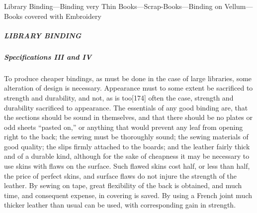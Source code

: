 \documentclass[
]{article}
\begin{document}
Library Binding---Binding very Thin Books---Scrap-Books---Binding on
Vellum---Books covered with Embroidery

\hypertarget{library-binding}{%
\subparagraph{LIBRARY BINDING}\label{library-binding}}

\hypertarget{specifications-iii-and-iv}{%
\subparagraph{\texorpdfstring{\emph{Specifications III and
IV}}{Specifications III and IV}}\label{specifications-iii-and-iv}}

{To} produce cheaper bindings, as must be done in the case of large
libraries, some alteration of design is necessary. Appearance must to
some extent be sacrificed to strength and durability, and not, as is
too{\protect\hypertarget{Page_174}{}{{[}174{]}}} often the case,
strength and durability sacrificed to appearance. The essentials of any
good binding are, that the sections should be sound in themselves, and
that there should be no plates or odd sheets ``pasted on,'' or anything
that would prevent any leaf from opening right to the back; the sewing
must be thoroughly sound; the sewing materials of good quality; the
slips firmly attached to the boards; and the leather fairly thick and of
a durable kind, although for the sake of cheapness it may be necessary
to use skins with flaws on the surface. Such flawed skins cost half, or
less than half, the price of perfect skins, and surface flaws do not
injure the strength of the leather. By sewing on tape, great flexibility
of the back is obtained, and much time, and consequent expense, in
covering is saved. By using a French joint much thicker leather than
usual can be used, with corresponding gain in strength.
\end{document}
